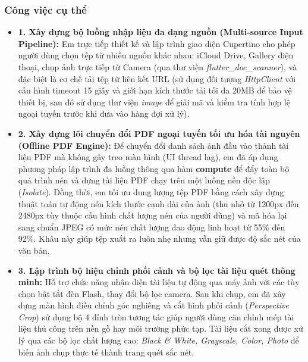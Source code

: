 \documentclass[12pt, a4paper]{article}
\begin{document}
\pdfUseCaseFigure

\subsubsection{Công việc cụ thể}
\begin{itemize}
    \item \textbf{1. Xây dựng bộ luồng nhập liệu đa dạng nguồn (Multi-source Input Pipeline):}
    Em trực tiếp thiết kế và lập trình giao diện Cupertino cho phép người dùng chọn tệp từ nhiều nguồn khác nhau: iCloud Drive, Gallery điện thoại, chụp ảnh trực tiếp từ Camera (qua thư viện \textit{flutter\_doc\_scanner}), và đặc biệt là cơ chế tải tệp từ liên kết URL (sử dụng đối tượng \textit{HttpClient} với cấu hình timeout 15 giây và giới hạn kích thước tải tối đa 20MB để bảo vệ thiết bị, sau đó sử dụng thư viện \textit{image} để giải mã và kiểm tra tính hợp lệ ngoại tuyến trước khi đưa vào hàng đợi xử lý).

    \item \textbf{2. Xây dựng lõi chuyển đổi PDF ngoại tuyến tối ưu hóa tài nguyên (Offline PDF Engine):}
    Để chuyển đổi danh sách ảnh đầu vào thành tài liệu PDF mà không gây treo màn hình (UI thread lag), em đã áp dụng phương pháp lập trình đa luồng thông qua hàm \textbf{compute} để đẩy toàn bộ quá trình nén và dựng tài liệu PDF chạy trên một luồng nền độc lập (\textit{Isolate}). Đồng thời, em tối ưu dung lượng tệp PDF bằng cách xây dựng thuật toán tự động nén kích thước cạnh dài của ảnh (thu nhỏ từ 1200px đến 2480px tùy thuộc cấu hình chất lượng nén của người dùng) và mã hóa lại sang chuẩn JPEG có mức nén chất lượng dao động linh hoạt từ 55\% đến 92\%. Khâu này giúp tệp xuất ra luôn nhẹ nhưng vẫn giữ được độ sắc nét của văn bản.

    \item \textbf{3. Lập trình bộ hiệu chỉnh phối cảnh và bộ lọc tài liệu quét thông minh:}
    Hỗ trợ chức năng nhận diện tài liệu tự động qua máy ảnh với các tùy chọn bật tắt đèn Flash, thay đổi bộ lọc camera. Sau khi chụp, em đã xây dựng màn hình điều chỉnh góc nghiêng và cắt hình phối cảnh (\textit{Perspective Crop}) sử dụng bộ 4 đỉnh tròn tương tác giúp người dùng căn chỉnh mép tài liệu thủ công trên nền gỗ hay môi trường phức tạp. Tài liệu cắt xong được xử lý qua các bộ lọc chất lượng cao: \textit{Black \& White, Grayscale, Color, Photo} để biến ảnh chụp thực tế thành trang quét sắc nét.


\end{itemize}
\end{document}
